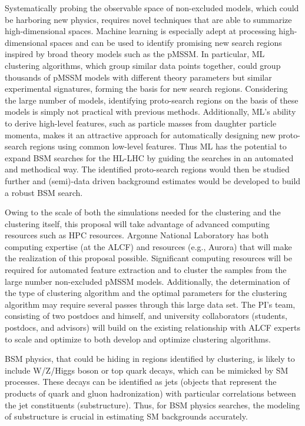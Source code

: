 \documentclass[letter, USenglish, 11pt, subfigure]{article}
\begin{document}
Systematically probing the observable space of non-excluded models, which could be harboring new physics, requires novel techniques that are able to summarize high-dimensional spaces. Machine learning is especially adept at processing high-dimensional spaces and can be used to identify promising new search regions inspired by broad theory models such as the pMSSM. In particular, ML clustering algorithms, which group similar data points together, could group thousands of pMSSM models with different theory parameters but similar experimental signatures, forming the basis for new search regions. Considering the large number of models, identifying proto-search regions on the basis of these models is simply not practical with previous methods. Additionally, ML's ability to derive high-level features, such as particle masses from daughter particle momenta, makes it an attractive approach for automatically designing new proto-search regions using common low-level features. Thus ML has the potential to expand BSM searches for the HL-LHC by guiding the searches in an automated and methodical way. The identified proto-search regions would then be studied further and (semi)-data driven background estimates would be developed to build a robust BSM search.

Owing to the scale of both the simulations needed for the clustering and the clustering itself, this proposal will take advantage of advanced computing resources such as HPC resources. Argonne National Laboratory has both computing expertise (at the ALCF) and resources (e.g., Aurora) that will make the realization of this proposal possible. Significant computing resources will be required for automated feature extraction and to cluster the samples from the large number non-excluded pMSSM models. Additionally, the determination of the type of clustering algorithm and the optimal parameters for the clustering algorithm may require several passes through this large data set. The PI's team, consisting of two postdocs and himself, and university collaborators (students, postdocs, and advisors) will build on the existing relationship with ALCF experts to scale and optimize to both develop and optimize clustering algorithms.

BSM physics, that could be hiding in regions identified by clustering, is likely to include W/Z/Higgs boson or top quark decays, which can be mimicked by SM processes. These decays can be identified as jets (objects that represent the products of quark and gluon hadronization) with particular correlations between the jet constituents (substructure). Thus, for BSM physics searches, the modeling of substructure is crucial in estimating SM backgrounds accurately.
\end{document}
